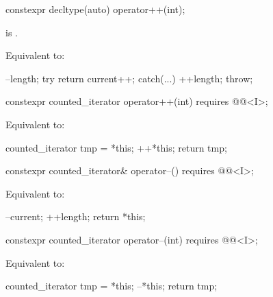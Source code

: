 %
\begin{itemdecl}
constexpr decltype(auto) operator++(int);
\end{itemdecl}

\begin{itemdescr}
\pnum
\hardexpects
{} is .

\pnum
\effects
Equivalent to:
\begin{codeblock}
--length;
try { return current++; }
catch(...) { ++length; throw; }
\end{codeblock}
\end{itemdescr}

%
\begin{itemdecl}
constexpr counted_iterator operator++(int)
  requires @@<I>;
\end{itemdecl}

\begin{itemdescr}
\pnum
\effects
Equivalent to:
\begin{codeblock}
counted_iterator tmp = *this;
++*this;
return tmp;
\end{codeblock}
\end{itemdescr}

%
\begin{itemdecl}
constexpr counted_iterator& operator--()
  requires @@<I>;
\end{itemdecl}

\begin{itemdescr}
\pnum
\effects
Equivalent to:
\begin{codeblock}
--current;
++length;
return *this;
\end{codeblock}
\end{itemdescr}

%
\begin{itemdecl}
constexpr counted_iterator operator--(int)
  requires @@<I>;
\end{itemdecl}

\begin{itemdescr}
\pnum
\effects
Equivalent to:
\begin{codeblock}
counted_iterator tmp = *this;
--*this;
return tmp;
\end{codeblock}
\end{itemdescr}

